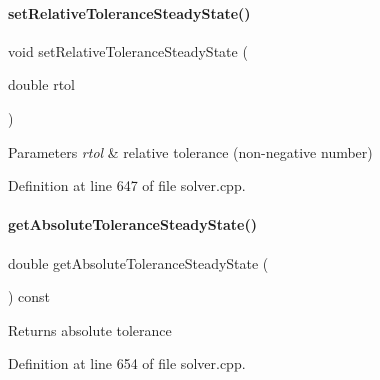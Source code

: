 \paragraph{\texorpdfstring{setRelativeToleranceSteadyState()}{setRelativeToleranceSteadyState()}}
{\footnotesize\ttfamily void set\+Relative\+Tolerance\+Steady\+State (\begin{DoxyParamCaption}\item[{double}]{rtol }\end{DoxyParamCaption})}


\begin{DoxyParams}{Parameters}
{\em rtol} & relative tolerance (non-\/negative number) \\
\hline
\end{DoxyParams}


Definition at line 647 of file solver.\+cpp.

\mbox{\label{classamici_1_1_solver_adbb1549f9762649455bde39c29d47a03}} 
\paragraph{\texorpdfstring{getAbsoluteToleranceSteadyState()}{getAbsoluteToleranceSteadyState()}}
{\footnotesize\ttfamily double get\+Absolute\+Tolerance\+Steady\+State (\begin{DoxyParamCaption}{ }\end{DoxyParamCaption}) const}

\begin{DoxyReturn}{Returns}
absolute tolerance 
\end{DoxyReturn}


Definition at line 654 of file solver.\+cpp.

